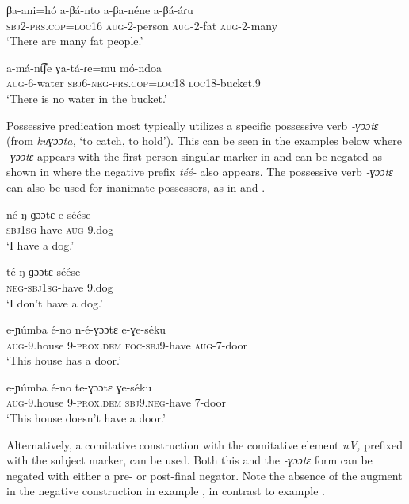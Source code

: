 \documentclass[output=paper,colorlinks,citecolor=brown,draftmode]{langscibook}
\begin{document}
\ea\label{ex:ngo:38} 
    \gll βa-ani=hó a-βá-nto a-βa-néne a-βá-áɾu\\ 
    \textsc{sbj2-prs.cop=loc16} \textsc{aug}{}-2-person \textsc{aug}{}-2-fat \textsc{aug}{}-2-many\\
    \glt ‘There are many fat people.’
\z

\ea\label{ex:ngo:39} 
    \gll a-má-nt͡ʃe ɣa-tá-ɾe=mu mó-ndoa\\ 
        \textsc{aug-}6-water \textsc{sbj6-neg-}\textsc{prs.cop=loc18} \textsc{loc18}{}-bucket.9\\
    \glt ‘There is no water in the bucket.’
\z 

Possessive predication most typically utilizes a specific possessive verb \textit{{}-ɣɔɔtɛ} (from \textit{kuɣɔɔta,} ‘to catch, to hold’). This can be seen in the examples below where \textit{{}-ɣɔɔtɛ} appears with the first person singular marker in  and can be negated as shown in  where the negative prefix \textit{téé-} also appears. The possessive verb \textit{{}-ɣɔɔtɛ} can also be used for inanimate possessors, as in  and . 

\ea\label{ex:ngo:40} 
    \gll né-ŋ-ɡɔɔtɛ e-séése\\ 
        \textsc{sbj}1\textsc{sg}{}-have \textsc{aug-}9.dog\\
    \glt ‘I have a dog.’
\z 

\ea\label{ex:ngo:41} 
    \gll té-ŋ{}-ɡɔɔtɛ séése\\ 
        \textsc{neg-sbj1sg}{}-have 9.dog\\
    \glt ‘I don’t have a dog.’
\z 

\ea\label{ex:ngo:42} 
    \gll e-ɲúmba é-no n-é{}-ɣɔɔtɛ e{}-ɣe-séku\\ 
        \textsc{aug-}9.house 9-\textsc{prox.dem} \textsc{foc-sbj9}{}-have \textsc{aug-}7-door\\
    \glt ‘This house has a door.’ 
\z 

\ea\label{ex:ngo:43} 
    \gll e-ɲúmba é-no te{}-ɣɔɔtɛ ɣe-séku\\ 
        \textsc{aug-}9.house 9-\textsc{prox.dem} \textsc{sbj}9.\textsc{neg}{}-have 7-door\\
    \glt ‘This house doesn’t have a door.’
\z 

Alternatively, a comitative construction with the comitative element \textit{nV,} prefixed with the subject marker, can be used. Both this and the \textit{{}-ɣɔɔtɛ} form can be negated with either a pre- or post-final negator. Note the absence of the augment in the negative construction in example , in contrast to example  .
\end{document}
